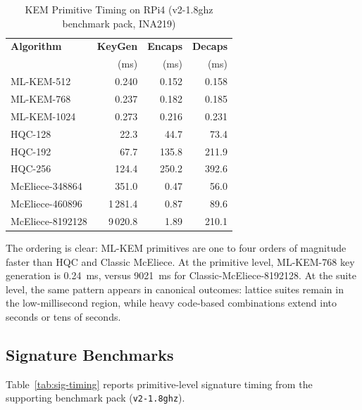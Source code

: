 \documentclass[conference]{IEEEtran}
\begin{document}
\begin{table}[t]
\centering
\caption{KEM Primitive Timing on RPi4 (v2-1.8ghz benchmark pack, INA219)}
\label{tab:kem-timing}
\small
\begin{tabular}{@{}lrrr@{}}
\toprule
\textbf{Algorithm} & \textbf{KeyGen} & \textbf{Encaps} & \textbf{Decaps} \\
 & (ms) & (ms) & (ms) \\
\midrule
ML-KEM-512 & 0.240 & 0.152 & 0.158 \\
ML-KEM-768 & 0.237 & 0.182 & 0.185 \\
ML-KEM-1024 & 0.273 & 0.216 & 0.231 \\
\midrule
HQC-128 & 22.3 & 44.7 & 73.4 \\
HQC-192 & 67.7 & 135.8 & 211.9 \\
HQC-256 & 124.4 & 250.2 & 392.6 \\
\midrule
McEliece-348864 & 351.0 & 0.47 & 56.0 \\
McEliece-460896 & 1\,281.4 & 0.87 & 89.6 \\
McEliece-8192128 & 9\,020.8 & 1.89 & 210.1 \\
\bottomrule
\end{tabular}
\end{table}

The ordering is clear: ML-KEM primitives are one to four orders of magnitude faster than HQC and Classic McEliece.
At the primitive level, ML-KEM-768 key generation is \SI{0.24}{\milli\second}, versus \SI{9021}{\milli\second} for Classic-McEliece-8192128.
At the suite level, the same pattern appears in canonical outcomes: lattice suites remain in the low-millisecond region, while heavy code-based combinations extend into seconds or tens of seconds.

\subsection{Signature Benchmarks}

Table~\ref{tab:sig-timing} reports primitive-level signature timing from the supporting benchmark pack (\texttt{v2-1.8ghz}).
\end{document}
